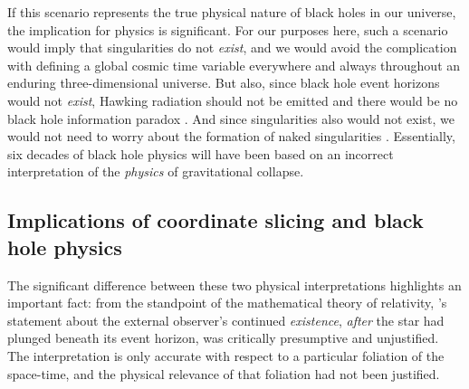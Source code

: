 \documentclass[aps,rmp,groupedaddress,twocolumn,10pt]{revtex4-2}
\begin{document}
If this scenario represents the true physical nature of black holes in our universe, the implication for physics is significant. For our purposes here, such a scenario would imply that singularities do not \textit{exist}, and we would avoid the complication with defining a global cosmic time variable everywhere and always throughout an enduring three-dimensional universe. But also, since black hole event horizons would not \textit{exist}, Hawking radiation should not be emitted \cite{Hawking1975} and there would be no black hole information paradox \cite{Hawking1976}. And since singularities also would not exist, we would not need to worry about the formation of naked singularities \cite{Penrose1969,Engelhardt2024}. Essentially, six decades of black hole physics will have been based on an incorrect interpretation of the \textit{physics} of gravitational collapse.

\subsection{Implications of coordinate slicing and black hole physics}

The significant difference between these two physical interpretations highlights an important fact: from the standpoint of the mathematical theory of relativity, \citeauthor{Penrose1969}'s~\citeyearpar{Penrose1969} statement about the external observer's continued \textit{existence}, \textit{after} the star had plunged beneath its event horizon, was critically presumptive and unjustified. The interpretation is only accurate with respect to a particular foliation of the space-time, and the physical relevance of that foliation had not been justified. 
\end{document}
